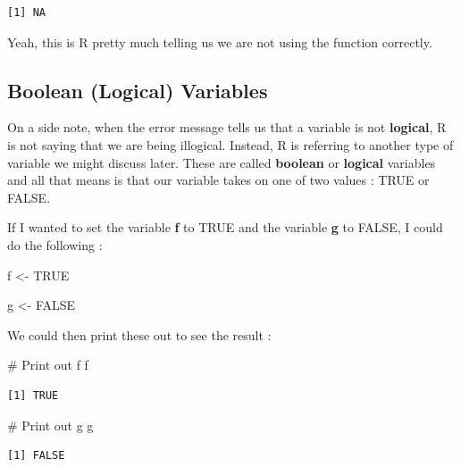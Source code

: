 \documentclass[
  letterpaper,
  DIV=11,
  numbers=noendperiod]{scrreprt}
\newenvironment{Shaded}{\begin{snugshade}}{\end{snugshade}}
\newcommand{\CommentTok}[1]{\textcolor[rgb]{0.37,0.37,0.37}{#1}}
\newcommand{\ConstantTok}[1]{\textcolor[rgb]{0.56,0.35,0.01}{#1}}
\newcommand{\NormalTok}[1]{\textcolor[rgb]{0.00,0.23,0.31}{#1}}
\newcommand{\OtherTok}[1]{\textcolor[rgb]{0.00,0.23,0.31}{#1}}
\begin{document}
\begin{verbatim}
[1] NA
\end{verbatim}

Yeah, this is R pretty much telling us we are not using the function
correctly.

\subsection*{Boolean (Logical)
Variables}\label{boolean-logical-variables}

On a side note, when the error message tells us that a variable is not
\textbf{logical}, R is not saying that we are being illogical. Instead,
R is referring to another type of variable we might discuss later. These
are called \textbf{boolean} or \textbf{logical} variables and all that
means is that our variable takes on one of two values : TRUE or FALSE.

If I wanted to set the variable \textbf{f} to TRUE and the variable
\textbf{g} to FALSE, I could do the following :

\begin{Shaded}
\begin{Highlighting}[]
\NormalTok{f }\OtherTok{\textless{}{-}} \ConstantTok{TRUE}

\NormalTok{g }\OtherTok{\textless{}{-}} \ConstantTok{FALSE}
\end{Highlighting}
\end{Shaded}

We could then print these out to see the result :

\begin{Shaded}
\begin{Highlighting}[]
\CommentTok{\# Print out f}
\NormalTok{f}
\end{Highlighting}
\end{Shaded}

\begin{verbatim}
[1] TRUE
\end{verbatim}

\begin{Shaded}
\begin{Highlighting}[]
\CommentTok{\# Print out g}
\NormalTok{g}
\end{Highlighting}
\end{Shaded}

\begin{verbatim}
[1] FALSE
\end{verbatim}
\end{document}
